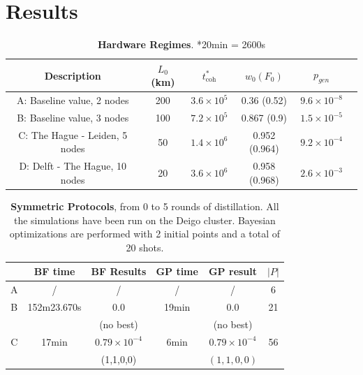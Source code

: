 \documentclass{article}
\begin{document}
\clearpage
\section*{Results}

\begin{table}[ht!]
    \centering
    \begin{tabular}{|c|c|c|c|c|c|}
        \hline
        Description & $L_0$ (km) & $t_{\text{coh}}^*$ & $w_0 (F_0)$ & $p_{gen}$ \\
        \hline
        \hline
        A: Baseline value, 2 nodes & 200  & $3.6 \times 10^5$ & 0.36 (0.52) & $9.6 \times 10^{-8}$ \\
        \hline
        B: Baseline value, 3 nodes & 100  & $7.2 \times 10^5$ & 0.867 (0.9) & $1.5 \times 10^{-5}$ \\
        \hline
        C: The Hague - Leiden, 5 nodes & 50  & $1.4 \times 10^6$ & 0.952 (0.964) & $9.2 \times 10^{-4}$ \\
        \hline
        D: Delft - The Hague, 10 nodes & 20  & $3.6 \times 10^6$ & 0.958 (0.968) & $2.6 \times 10^{-3}$ \\
        \hline
    \end{tabular}
    \caption{\textbf{Hardware Regimes}. \quad **20min = 2600s}
    \label{tab:hardware_regimes}
\end{table}

\begin{table}[ht!]
    \centering
    \begin{tabular}{|c|c|c|c|c|c|}
        \hline
        & BF time & BF Results & GP time & GP result & $|P|$ \\
        \hline
        \hline
        A & / & / & / & / & 6 \\
        \hline
        B & 152m23.670s & 0.0 & 19min & 0.0 & 21 \\
        & & (no best) & & (no best) & \\
        \hline
        C & 17min & $0.79 \times 10^{-4}$ & 6min & $0.79 \times 10^{-4}$ & 56 \\
        & & (1,1,0,0) & & $(1,1,0,0)$ & \\
        \hline
    \end{tabular}
    \caption{\textbf{Symmetric Protocols}, from 0 to 5 rounds of distillation. All the simulations have been run on the Deigo cluster. Bayesian optimizations are performed with 2 initial points and a total of 20 shots.}
    \label{tab:symmetric_protocols}
\end{table}
\end{document}
